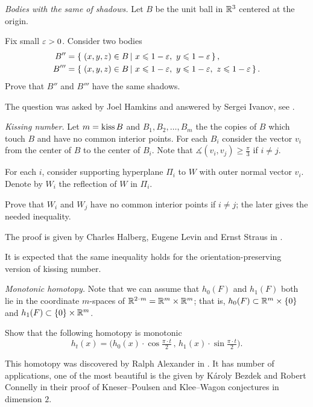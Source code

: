 \textit{Bodies with the same of shadows.}
Let $B$ be the unit ball in $\mathbb{R}^3$ centered at the origin.

Fix small $\varepsilon>0$.
Consider two bodies 
\begin{align*}
B''&=\set{(x,y,z)\in B}{x\le 1-\eps,\  y\le 1-\eps},
\\ 
B'''&=\set{(x,y,z)\in B}{x\le 1-\eps,\  y\le 1-\eps,\  z\le 1-\eps}.
\end{align*}
Prove that $B''$ and $B'''$ have the same shadows.

 The question was asked by Joel Hamkins and answered by Sergei Ivanov, see \cite{hamkins}.



\textit{Kissing number.}
Let $m=\mathop{\rm kiss} B$
and $B_1,B_2,\dots, B_m$ the the copies of $B$ 
which touch $B$ and have no common interior points.
For each $B_i$ consider the vector $v_i$ from the center of $B$ to the center of $B_i$.
Note that $\measuredangle(v_i,v_j)\ge \tfrac\pi3$ if $i\ne j$.

For each $i$,
consider supporting hyperplane $\Pi_i$
to $W$
with outer normal vector $v_i$.
Denote by $W_i$ the reflection of $W$ in $\Pi_i$.

Prove that $W_i$ and $W_j$ have no common interior points if $i\ne j$;
the later gives the needed inequality.

The proof is given by 
Charles Halberg, 
Eugene Levin 
and Ernst Straus 
in \cite{halberg-levin-straus}.

It is expected that the same inequality holds for the orientation-preserving version of kissing number.



\textit{Monotonic homotopy.}
Note that we can assume
that $h_0(F)$ and $h_1(F)$ both lie in the coordinate $m$-spaces of $\RR^{2\cdot m}=\RR^m\times \RR^m$;
that is,
$h_0(F)\z\subset\RR^m\times\{0\}$
and $h_1(F)\subset  \{0\}\times\mathbb{R}^m$.

Show that the following homotopy is monotonic
\[h_t(x)=\bigl(h_0(x)\cdot \cos\tfrac{\pi\cdot t}2
\,,\,
 h_1(x)\cdot\sin\tfrac{\pi\cdot t}{2}\bigr).\] 


This homotopy was discovered by Ralph Alexander in \cite{ralexander}.
It has number of applications, 
one of the most beautiful is the given 
by K{\'a}roly Bezdek 
and Robert Connelly \cite{bezdek-connelly} 
in their proof of 
Kneser--Poulsen  
and Klee--Wagon conjectures in dimension $2$.

